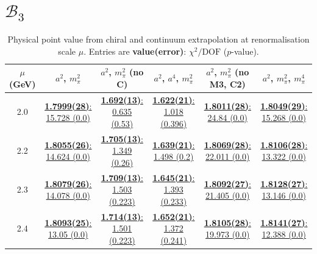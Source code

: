 \documentclass[12pt]{extarticle}
\begin{document}
\section{$\mathcal{B}_3$}
\begin{table}[h!]
\begin{center}
\begin{tabular}{|c|c|c|c|c|c|}
\hline
$\mu$ (GeV) & $a^2$, $m_\pi^2$& $a^2$, $m_\pi^2$ (no C)& $a^2$, $a^4$, $m_\pi^2$& $a^2$, $m_\pi^2$ (no M3, C2)& $a^2$, $m_\pi^2$, $m_\pi^4$\\
\hline
2.0& \hyperlink{SSmPP/NPR/a2m2_20.pdf.1}{\textbf{1.7999(28)}: 15.728 (0.0)} & \hyperlink{SSmPP/NPR/a2m2noC_20.pdf.1}{\textbf{1.692(13)}: 0.635 (0.53)} & \hyperlink{SSmPP/NPR/a2a4m2_20.pdf.1}{\textbf{1.622(21)}: 1.018 (0.396)} & \hyperlink{SSmPP/NPR/a2m2mcut_20.pdf.1}{\textbf{1.8011(28)}: 24.84 (0.0)} & \hyperlink{SSmPP/NPR/a2m2m4_20.pdf.1}{\textbf{1.8049(29)}: 15.268 (0.0)}\\
2.2& \hyperlink{SSmPP/NPR/a2m2_22.pdf.1}{\textbf{1.8055(26)}: 14.624 (0.0)} & \hyperlink{SSmPP/NPR/a2m2noC_22.pdf.1}{\textbf{1.705(13)}: 1.349 (0.26)} & \hyperlink{SSmPP/NPR/a2a4m2_22.pdf.1}{\textbf{1.639(21)}: 1.498 (0.2)} & \hyperlink{SSmPP/NPR/a2m2mcut_22.pdf.1}{\textbf{1.8069(28)}: 22.011 (0.0)} & \hyperlink{SSmPP/NPR/a2m2m4_22.pdf.1}{\textbf{1.8106(28)}: 13.322 (0.0)}\\
2.3& \hyperlink{SSmPP/NPR/a2m2_23.pdf.1}{\textbf{1.8079(26)}: 14.078 (0.0)} & \hyperlink{SSmPP/NPR/a2m2noC_23.pdf.1}{\textbf{1.709(13)}: 1.503 (0.223)} & \hyperlink{SSmPP/NPR/a2a4m2_23.pdf.1}{\textbf{1.645(21)}: 1.393 (0.233)} & \hyperlink{SSmPP/NPR/a2m2mcut_23.pdf.1}{\textbf{1.8092(27)}: 21.405 (0.0)} & \hyperlink{SSmPP/NPR/a2m2m4_23.pdf.1}{\textbf{1.8128(27)}: 13.146 (0.0)}\\
2.4& \hyperlink{SSmPP/NPR/a2m2_24.pdf.1}{\textbf{1.8093(25)}: 13.05 (0.0)} & \hyperlink{SSmPP/NPR/a2m2noC_24.pdf.1}{\textbf{1.714(13)}: 1.501 (0.223)} & \hyperlink{SSmPP/NPR/a2a4m2_24.pdf.1}{\textbf{1.652(21)}: 1.372 (0.241)} & \hyperlink{SSmPP/NPR/a2m2mcut_24.pdf.1}{\textbf{1.8105(28)}: 19.973 (0.0)} & \hyperlink{SSmPP/NPR/a2m2m4_24.pdf.1}{\textbf{1.8141(27)}: 12.388 (0.0)}\\
\hline
\end{tabular}
\caption{Physical point value from chiral and continuum extrapolation at renormalisation scale $\mu$. Entries are \textbf{value(error)}: $\chi^2/\text{DOF}$ ($p$-value).}
\end{center}
\end{table}
\end{document}
